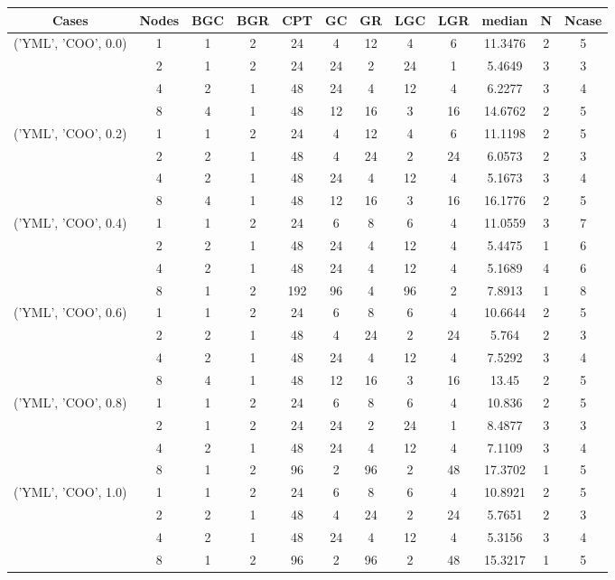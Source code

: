 \begin{tabular}{cccccccccccc}
\hline
Cases & Nodes& BGC& BGR& CPT& GC& GR& LGC& LGR& median & N & Ncase \\
\hline
\multirow{4}{*}{('YML', 'COO', 0.0)}& 1& 1& 2& 24& 4& 12& 4& 6& 11.3476& 2& 5\\
& 2& 1& 2& 24& 24& 2& 24& 1& 5.4649& 3& 3\\
& 4& 2& 1& 48& 24& 4& 12& 4& 6.2277& 3& 4\\
& 8& 4& 1& 48& 12& 16& 3& 16& 14.6762& 2& 5\\
\hline
\multirow{4}{*}{('YML', 'COO', 0.2)}& 1& 1& 2& 24& 4& 12& 4& 6& 11.1198& 2& 5\\
& 2& 2& 1& 48& 4& 24& 2& 24& 6.0573& 2& 3\\
& 4& 2& 1& 48& 24& 4& 12& 4& 5.1673& 3& 4\\
& 8& 4& 1& 48& 12& 16& 3& 16& 16.1776& 2& 5\\
\hline
\multirow{4}{*}{('YML', 'COO', 0.4)}& 1& 1& 2& 24& 6& 8& 6& 4& 11.0559& 3& 7\\
& 2& 2& 1& 48& 24& 4& 12& 4& 5.4475& 1& 6\\
& 4& 2& 1& 48& 24& 4& 12& 4& 5.1689& 4& 6\\
& 8& 1& 2& 192& 96& 4& 96& 2& 7.8913& 1& 8\\
\hline
\multirow{4}{*}{('YML', 'COO', 0.6)}& 1& 1& 2& 24& 6& 8& 6& 4& 10.6644& 2& 5\\
& 2& 2& 1& 48& 4& 24& 2& 24& 5.764& 2& 3\\
& 4& 2& 1& 48& 24& 4& 12& 4& 7.5292& 3& 4\\
& 8& 4& 1& 48& 12& 16& 3& 16& 13.45& 2& 5\\
\hline
\multirow{4}{*}{('YML', 'COO', 0.8)}& 1& 1& 2& 24& 6& 8& 6& 4& 10.836& 2& 5\\
& 2& 1& 2& 24& 24& 2& 24& 1& 8.4877& 3& 3\\
& 4& 2& 1& 48& 24& 4& 12& 4& 7.1109& 3& 4\\
& 8& 1& 2& 96& 2& 96& 2& 48& 17.3702& 1& 5\\
\hline
\multirow{4}{*}{('YML', 'COO', 1.0)}& 1& 1& 2& 24& 6& 8& 6& 4& 10.8921& 2& 5\\
& 2& 2& 1& 48& 4& 24& 2& 24& 5.7651& 2& 3\\
& 4& 2& 1& 48& 24& 4& 12& 4& 5.3156& 3& 4\\
& 8& 1& 2& 96& 2& 96& 2& 48& 15.3217& 1& 5\\
\hline
\end{tabular}



